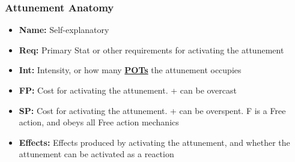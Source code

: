 \documentclass[12pt]{article}
\newcommand{\refto}[1]{\hyperlink{#1}{\textbf{#1}}}
\begin{document}
\subsubsection*{Attunement Anatomy}
\begin{itemize}
\item \textbf{Name:} Self-explanatory
\item \textbf{Req:} Primary Stat or other requirements for activating the attunement
\item \textbf{Int:} Intensity, or how many \refto{POTs} the attunement occupies 
\item \textbf{FP:} Cost for activating the attunement. + can be overcast
\item \textbf{SP:} Cost for activating the attunement. + can be overspent. F is a Free action, and obeys all Free action mechanics
\item \textbf{Effects:} Effects produced by activating the attunement, and whether the attunement can be activated as a reaction
\end{itemize}
\end{document}
